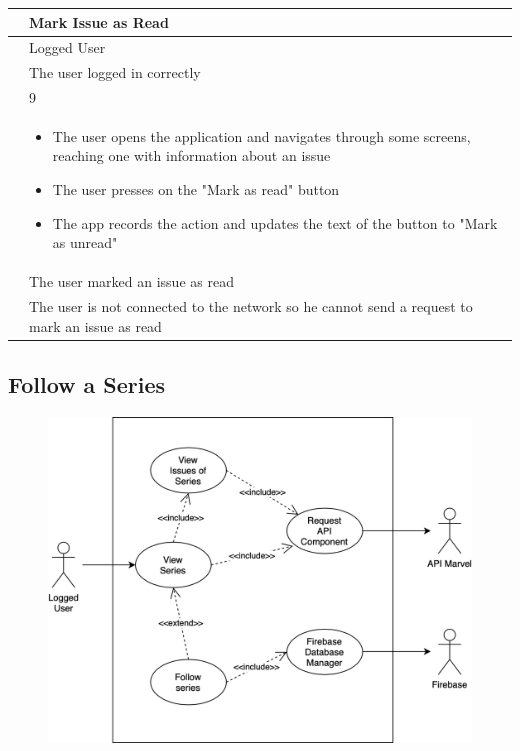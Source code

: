 {{{{{{\renewcommand{\arraystretch}{2}
{\begin{center}
\begin{tabular}{ | m{4cm} | m{9cm} | } 
 \hline
 {\centering{\textbf{Name}}} & Mark Issue as Read \\
 \hline
 {\centering{\textbf{Actor}}} & Logged User \\
 \hline
 {\centering{\textbf{Entry Condition}}} & The user logged in correctly \\
 \hline
 {\centering{\textbf{Goal}}} & 9 \\
 \hline
 {\centering{\textbf{Event flow}}} & \begin{itemize}[leftmargin=*]
 	\item The user opens the application and navigates through some screens, reaching one with information about an issue
	\item The user presses on the "Mark as read" button 
	\item The app records the action and updates the text of the button to "Mark as unread"
	\end{itemize} \\	
 \hline
 {\centering{\textbf{Exit condition}}} & The user marked an issue as read \\
 \hline
 {\centering{\textbf{Exceptions}}} & The user is not connected to the network so he cannot send a request to mark an issue as read \\
 \hline
\end{tabular}
\end{center}}

\clearpage

\subsection{Follow a Series}
\begin{figure}[h]
\centering
\includegraphics[width=\textwidth]{img/usecases/followseries}
\end{figure}

}}}}}}
